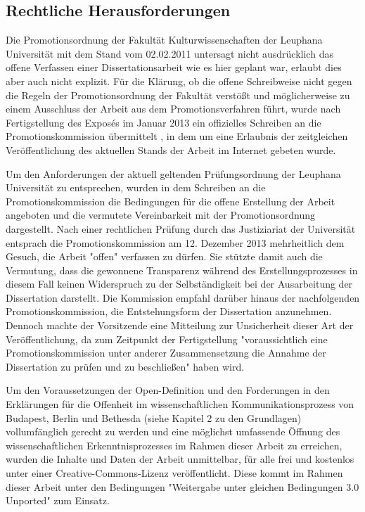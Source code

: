 \subsection{Rechtliche Herausforderungen}

Die Promotionsordnung der Fakultät Kulturwissenschaften der Leuphana Universität mit dem Stand vom 02.02.2011 \cite{Leuphana_2011} untersagt nicht ausdrücklich das offene Verfassen einer Dissertationsarbeit wie es hier geplant war, erlaubt dies aber auch nicht explizit. Für die Klärung, ob die offene Schreibweise nicht gegen die Regeln der Promotionsordnung der Fakultät verstößt und möglicherweise zu einem Ausschluss der Arbeit aus dem Promotionsverfahren führt, wurde nach Fertigstellung des Exposés im Januar 2013 ein offizielles Schreiben an die Promotionskommission übermittelt \cite{Heise_2013}, in dem um eine Erlaubnis der zeitgleichen Veröffentlichung des aktuellen Stands der Arbeit im Internet gebeten wurde.

Um den Anforderungen der aktuell geltenden Prüfungsordnung der Leuphana Universität zu entsprechen, wurden in dem Schreiben an die Promotionskommission die Bedingungen für die offene Erstellung der Arbeit angeboten und die vermutete Vereinbarkeit mit der Promotionsordnung dargestellt. Nach einer rechtlichen Prüfung durch das Justiziariat der Universität entsprach die Promotionskommission am 12. Dezember 2013 mehrheitlich dem Gesuch, die Arbeit "offen" verfassen zu dürfen. Sie stützte damit auch die Vermutung, dass die gewonnene Transparenz während des Erstellungsprozesses in diesem Fall keinen Widerspruch zu der Selbständigkeit bei der Ausarbeitung der Dissertation darstellt. Die Kommission empfahl darüber hinaus der nachfolgenden Promotionskommission, die Entstehungsform der Dissertation anzunehmen. Dennoch machte der Vorsitzende eine Mitteilung zur Unsicherheit dieser Art der Veröffentlichung, da zum Zeitpunkt der Fertigstellung "voraussichtlich eine Promotionskommission unter anderer Zusammensetzung die Annahme der Dissertation zu prüfen und zu beschließen" \cite{Heise_2013a} haben wird.

Um den Voraussetzungen der Open-Definition und den Forderungen in den Erklärungen für die Offenheit im wissenschaftlichen Kommunikationsprozess von Budapest, Berlin und Bethesda (siehe Kapitel 2 zu den Grundlagen) vollumfänglich gerecht zu werden und eine möglichst umfassende Öffnung des wissenschaftlichen Erkenntnisprozesses im Rahmen dieser Arbeit zu erreichen, wurden die Inhalte und Daten der Arbeit unmittelbar, für alle frei und kostenlos unter einer Creative-Commons-Lizenz veröffentlicht. Diese kommt im Rahmen dieser Arbeit unter den Bedingungen "Weitergabe unter gleichen Bedingungen 3.0 Unported" zum Einsatz.

